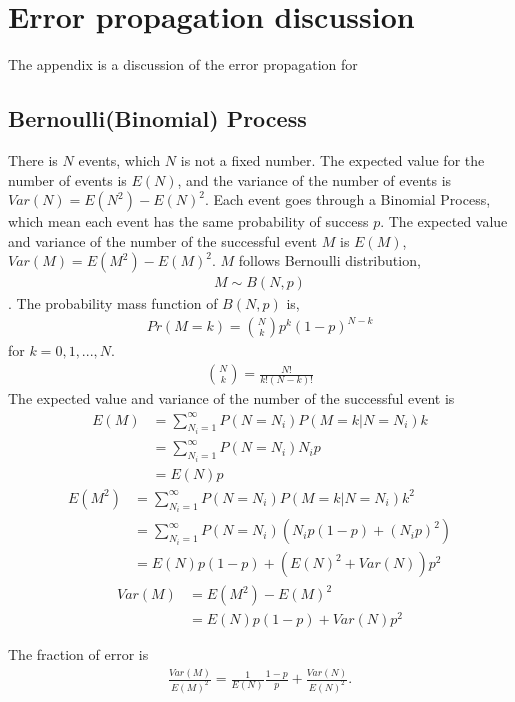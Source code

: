 \chapter{Error propagation discussion}
The appendix is a discussion of the error propagation for
\section{Bernoulli(Binomial) Process}
There is $N$ events, which $N$ is not a fixed number. The expected value for the number of events is $E(N)$, and the variance of the number of events is $Var(N)=E(N^2)-{E(N)}^2$. Each event goes through a Binomial Process, which mean each event has the same probability of success $p$. The expected value and variance of the number of the successful event $M$ is $E(M)$, $Var(M)=E(M^2)-E(M)^2$.
$M$ follows Bernoulli distribution, 
\begin{align}
M \sim B(N, p)
\end{align}.
The probability mass function of $B(N, p)$ is, 
\begin{align}
 Pr(M=k)=\binom{N}{k} p^k {(1-p)}^{N-k}
\end{align}for $k=0,1,...,N$.
\begin{align}
\binom{N}{k} = \frac{N!}{k!(N-k)!}
\end{align}
The expected value and variance of the number of the successful event is
\begin{align}
E(M) & = \sum_{N_i=1}^{\infty} P(N=N_i) P(M=k|N=N_i) k \\
     & = \sum_{N_i=1}^{\infty} P(N=N_i) N_i p \\
     & = E(N)p
\end{align}
\begin{align}
E(M^2) & = \sum_{N_i=1}^{\infty} P(N=N_i) P(M=k|N=N_i) k^2 \\
       & = \sum_{N_i=1}^{\infty} P(N=N_i) (N_i p(1-p) + {(N_i p)}^2) \\
       & = E(N)p(1-p) + (E(N)^2 + Var(N))p^2
\end{align}
\begin{align}
Var(M) & = E(M^2)-E(M)^2 \\
       & = E(N)p(1-p) + Var(N)p^2
\end{align}

The fraction of error is
\begin{align}
\frac{Var(M)}{E(M)^2} = \frac{1}{E(N)}\frac{1-p}{p}+ \frac{Var(N)}{E(N)^2}.
\end{align}

